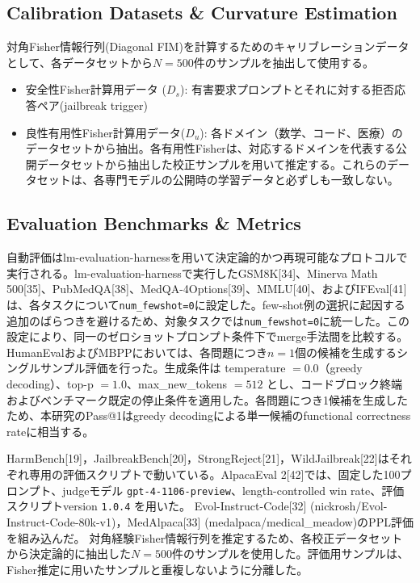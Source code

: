 \documentclass{article}
\begin{document}
\subsection{Calibration Datasets \& Curvature Estimation}
\label{app:calibration_datasets}
対角Fisher情報行列(Diagonal FIM)を計算するためのキャリブレーションデータとして、各データセットから$N=500$件のサンプルを抽出して使用する。
\begin{itemize}
\item 安全性Fisher計算用データ ($D_s$): 有害要求プロンプトとそれに対する拒否応答ペア(jailbreak trigger)
\item 良性有用性Fisher計算用データ($D_u$): 各ドメイン（数学、コード、医療）のデータセットから抽出。各有用性Fisherは、対応するドメインを代表する公開データセットから抽出した校正サンプルを用いて推定する。これらのデータセットは、各専門モデルの公開時の学習データと必ずしも一致しない。
\end{itemize}

\subsection{Evaluation Benchmarks \& Metrics}
\label{app:evaluation_benchmarks}
自動評価はlm-evaluation-harnessを用いて決定論的かつ再現可能なプロトコルで実行される。lm-evaluation-harnessで実行したGSM8K[34]、Minerva Math 500[35]、PubMedQA[38]、MedQA-4Options[39]、MMLU[40]、およびIFEval[41]は、各タスクについて\texttt{num\_fewshot=0}に設定した。few-shot例の選択に起因する追加のばらつきを避けるため、対象タスクでは\texttt{num\_fewshot=0}に統一した。この設定により、同一のゼロショットプロンプト条件下でmerge手法間を比較する。
HumanEvalおよびMBPPにおいては、各問題につき\(n=1\)個の候補を生成するシングルサンプル評価を行った。生成条件は temperature \(=0.0\)（greedy decoding）、top-p \(=1.0\)、max\_new\_tokens \(=512\) とし、コードブロック終端およびベンチマーク既定の停止条件を適用した。各問題につき1候補を生成したため、本研究のPass@1はgreedy decodingによる単一候補のfunctional correctness rateに相当する。

HarmBench[19]，JailbreakBench[20]，StrongReject[21]，WildJailbreak[22]はそれぞれ専用の評価スクリプトで動いている。AlpacaEval 2[42]では、固定した100プロンプト、judgeモデル \texttt{gpt-4-1106-preview}、length-controlled win rate、評価スクリプトversion \texttt{1.0.4} を用いた。
Evol-Instruct-Code[32] (nickrosh/Evol-Instruct-Code-80k-v1)，MedAlpaca[33] (medalpaca/medical\_meadow)のPPL評価を組み込んだ。
対角経験Fisher情報行列を推定するため、各校正データセットから決定論的に抽出した\(N=500\)件のサンプルを使用した。評価用サンプルは、Fisher推定に用いたサンプルと重複しないように分離した。
\end{document}
